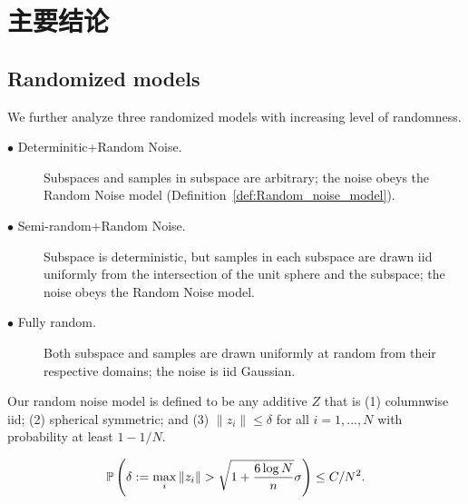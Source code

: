 \documentclass[12pt,heading]{ctexbook}
\begin{document}


\tableofcontents



%
\section{主要结论}\label{sec:main}
\subsection{Randomized models}
We  further analyze three randomized models with increasing level of randomness.
\begin{description}
  \item[$\bullet$ Determinitic+Random Noise.] Subspaces and samples in subspace are arbitrary; the noise obeys the Random Noise model (Definition~\ref{def:Random_noise_model}).
  \item[$\bullet$ Semi-random+Random Noise.] Subspace is deterministic, but samples in each subspace are drawn iid uniformly from the intersection of the unit sphere and the subspace; the noise obeys the Random Noise model.
  \item[$\bullet$ Fully random.] Both subspace and samples are drawn uniformly at random from their respective domains; the noise is iid Gaussian.%
\end{description}

\begin{definition}\label{def:Random_noise_model}
Our random noise model is defined to be any additive $Z$ that is (1) columnwise iid; (2) spherical symmetric;  and (3) $\|z_i\|\leq \delta$ for all $i=1,...,N$ with probability at least $1-1/N$.
\end{definition}
$$\P\left(\delta:=\max_i\|z_i\| > \sqrt{1+\frac{6\log N}{n}}\sigma\right) \leq C/N^2.$$
\end{document}
